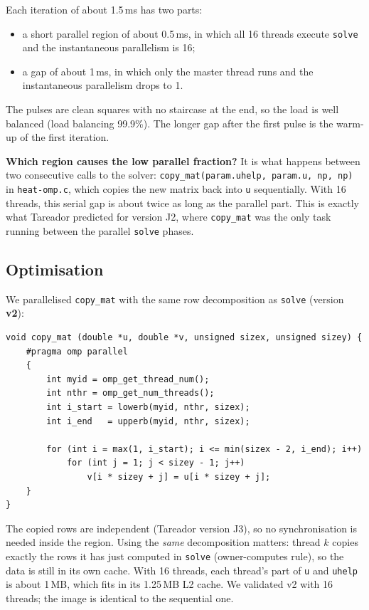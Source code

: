 \documentclass[11pt,a4paper]{article}
\begin{document}
Each iteration of about 1.5\,ms has two parts:
\begin{itemize}
  \item a short parallel region of about 0.5\,ms, in which all 16 threads execute \texttt{solve} and the instantaneous parallelism is 16;
  \item a gap of about 1\,ms, in which only the master thread runs and the instantaneous parallelism drops to 1.
\end{itemize}
The pulses are clean squares with no staircase at the end, so the load is well balanced (load balancing 99.9\%). The longer gap after the first pulse is the warm-up of the first iteration.

\textbf{Which region causes the low parallel fraction?} It is what happens between two consecutive calls to the solver: \texttt{copy\_mat(param.uhelp, param.u, np, np)} in \texttt{heat-omp.c}, which copies the new matrix back into \texttt{u} sequentially. With 16 threads, this serial gap is about twice as long as the parallel part. This is exactly what Tareador predicted for version J2, where \texttt{copy\_mat} was the only task running between the parallel \texttt{solve} phases.

\subsection{Optimisation}

We parallelised \texttt{copy\_mat} with the same row decomposition as \texttt{solve} (version \textbf{v2}):

\begin{lstlisting}
void copy_mat (double *u, double *v, unsigned sizex, unsigned sizey) {
    #pragma omp parallel
    {
        int myid = omp_get_thread_num();
        int nthr = omp_get_num_threads();
        int i_start = lowerb(myid, nthr, sizex);
        int i_end   = upperb(myid, nthr, sizex);

        for (int i = max(1, i_start); i <= min(sizex - 2, i_end); i++)
            for (int j = 1; j < sizey - 1; j++)
                v[i * sizey + j] = u[i * sizey + j];
    }
}
\end{lstlisting}

The copied rows are independent (Tareador version J3), so no synchronisation is needed inside the region. Using the \emph{same} decomposition matters: thread $k$ copies exactly the rows it has just computed in \texttt{solve} (owner-computes rule), so the data is still in its own cache. With 16 threads, each thread's part of \texttt{u} and \texttt{uhelp} is about 1\,MB, which fits in its 1.25\,MB L2 cache. We validated v2 with 16 threads; the image is identical to the sequential one.
\end{document}
